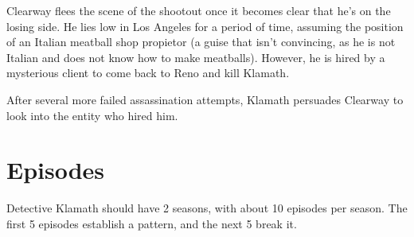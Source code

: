 \documentclass{article}
\begin{document}
Clearway flees the scene of the shootout once it becomes clear that he's on the losing side. He lies low in Los Angeles for a period of time, assuming the position of an Italian meatball shop propietor (a guise that isn't convincing, as he is not Italian and does not know how to make meatballs). However, he is hired by a mysterious client to come back to Reno and kill Klamath.

After several more failed assassination attempts, Klamath persuades Clearway to look into the entity who hired him.

\section{Episodes}

Detective Klamath should have 2 seasons, with about 10 episodes per season. The first 5 episodes establish a pattern, and the next 5 break it.
\end{document}
